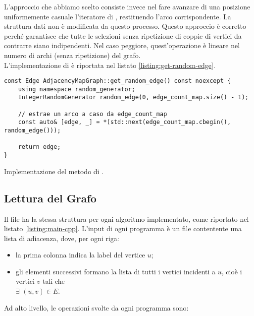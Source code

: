\noindent L'approccio che abbiamo scelto consiste invece nel fare avanzare di una posizione uniformemente casuale l'iteratore di , restituendo l'arco corrispondente. La struttura dati non è modificata da questo processo. Questo approccio è corretto perché garantisce che tutte le selezioni senza ripetizione di coppie di vertici da contrarre siano indipendenti. Nel caso peggiore, quest'operazione è lineare nel numero di archi (senza ripetizione) del grafo. \\

\noindent L'implementazione di  è riportata nel listato \ref{listing:get-random-edge}.

\begin{listing}[!ht]
\begin{verbatim}
const Edge AdjacencyMapGraph::get_random_edge() const noexcept {
    using namespace random_generator;
    IntegerRandomGenerator random_edge(0, edge_count_map.size() - 1);

    // estrae un arco a caso da edge_count_map
    const auto& [edge, _] = *(std::next(edge_count_map.cbegin(), random_edge()));

    return edge;
}
\end{verbatim}
\caption{Implementazione del metodo  di .}
\label{listing:get-random-edge}
\end{listing}

\subsection{Lettura del Grafo}

\noindent Il file  ha la stessa struttura per
ogni algoritmo implementato, come riportato nel listato \ref{listing:main-cpp}.
L'input di ogni programma è un file contentente una lista di
adiacenza, dove, per ogni riga:

\begin{itemize}
    \item la prima colonna indica la label del vertice $u$;
    \item gli elementi successivi formano la lista di tutti i vertici
      incidenti a $u$, cioè i vertici $v$ tali che \\ $\exists$ $(u, v) \in E$.
\end{itemize}

\noindent Ad alto livello, le operazioni svolte da ogni programma sono:

